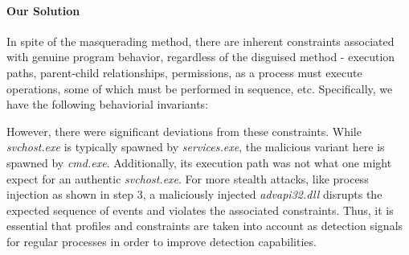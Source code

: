 \paragraph{Our Solution}
\label{sec:intuition}

In spite of the masquerading method, there are inherent constraints associated with genuine program behavior, regardless of the disguised method - execution paths, parent-child relationships, permissions, as a process must execute operations, some of which must be performed in sequence, etc. Specifically, we have the following behaviorial invariants:


However, there were significant deviations from these constraints. 
While \textit{svchost.exe} is typically spawned by \textit{services.exe}, the malicious variant here is spawned by \textit{cmd.exe}. Additionally, its execution path was not what one might expect for an authentic \textit{svchost.exe}.
For more stealth attacks, like process injection as shown in step 3, a maliciously injected \textit{advapi32.dll} disrupts the expected sequence of events and violates the associated constraints. Thus, it is essential that profiles and constraints are taken into account as detection signals for regular processes in order to improve detection capabilities.





